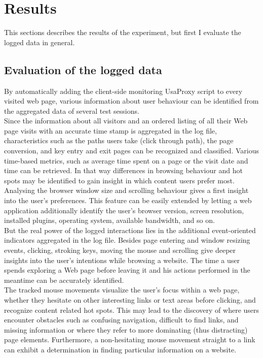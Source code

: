 \section{Results}
\label{sec:results}
This sections describes the results of the experiment, but first I evaluate the logged data in general.

\subsection{Evaluation of the logged data}
By automatically adding the client-side monitoring UsaProxy script to every visited web page, various information about user behaviour can be identified from the aggregated data of several test sessions.\\

Since the information about all visitors and an ordered listing of all their Web page visits with an accurate time stamp is aggregated in the log file, characteristics such as the paths users take (click through path), the page conversion, and key entry and exit pages can be recognized and classified. Various time-based metrics, such as average time spent on a page or the visit date and time can be retrieved. In that way differences in browsing behaviour and hot spots may be identified to gain insight in which content users prefer most.\\

Analysing the browser window size and scrolling behaviour gives a first insight into the user's preferences. This feature can be easily extended by letting a web application additionally identify the user's browser version, screen resolution, installed plugins, operating system, available bandwidth, and so on.\\

But the real power of the logged interactions lies in the additional event-oriented indicators aggregated in the log file. Besides page entering and window resizing events, clicking, stroking keys, moving the mouse and scrolling give deeper insights into the user's intentions while browsing a website. The time a user spends exploring a Web page before leaving it and his actions performed in the meantime can be accurately identified.\\

The tracked mouse movements visualize the user's focus within a web page, whether they hesitate on other interesting links or text areas before clicking, and recognize content related hot spots.
This may lead to the discovery of where users encounter obstacles such as confusing navigation, difficult to find links, and missing information or where they refer to more dominating (thus distracting) page elements. Furthermore, a non-hesitating mouse movement straight to a link can exhibit a determination in finding particular information on a website. \\

